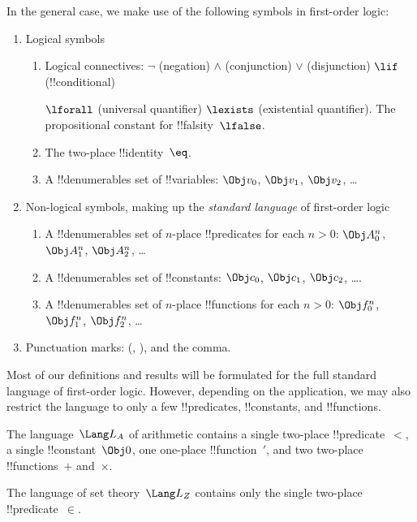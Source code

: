 In the general case, we make use of the following symbols in
first-order logic:

\begin{enumerate}
\item Logical symbols
\begin{enumerate}
\item Logical connectives:
  \startycommalist
  \ycomma $\lnot$ (negation)
  \ycomma $\land$ (conjunction)
  \ycomma $\lor$ (disjunction)
  \ycomma $\lif$ (!!{conditional})
  
  \ycomma $\lforall$ (universal quantifier)
  \ycomma $\lexists$ (existential quantifier).
The propositional constant for !!{falsity}~$\lfalse$.

\item The two-place !!{identity}~$\eq$.
\item A !!{denumerable}s set of !!{variable}s: $\Obj v_0$, $\Obj v_1$, $\Obj
  v_2$, \dots
\end{enumerate}
\item Non-logical symbols, making up the \emph{standard
  language} of first-order logic
\begin{enumerate}
\item A !!{denumerable}s set of $n$-place !!{predicate}s for each $n>0$: $\Obj
  A^n_0$, $\Obj A^n_1$, $\Obj A^n_2$, \dots
\item A !!{denumerable}s set of !!{constant}s: $\Obj c_0$, $\Obj c_1$, $\Obj
  c_2$, \dots.
\item A !!{denumerable}s set of $n$-place !!{function}s for each $n>0$:
  $\Obj f^n_0$, $\Obj f^n_1$, $\Obj f^n_2$, \dots
\end{enumerate}
\item Punctuation marks: (, ), and the comma.
\end{enumerate}

Most of our definitions and results will be formulated for the full
standard language of first-order logic.  However, depending on the
application, we may also restrict the language to only a few
!!{predicate}s, !!{constant}s, and !!{function}s.

\begin{ex}
The language~$\Lang L_A$ of arithmetic contains a single two-place
!!{predicate}~$<$, a single !!{constant}~$\Obj 0$, one one-place
!!{function}~$\prime$, and two two-place !!{function}s~$+$ and~$\times$.
\end{ex}

\begin{ex}
The language of set theory~$\Lang L_Z$ contains only the single
two-place !!{predicate}~$\in$.
\end{ex}

